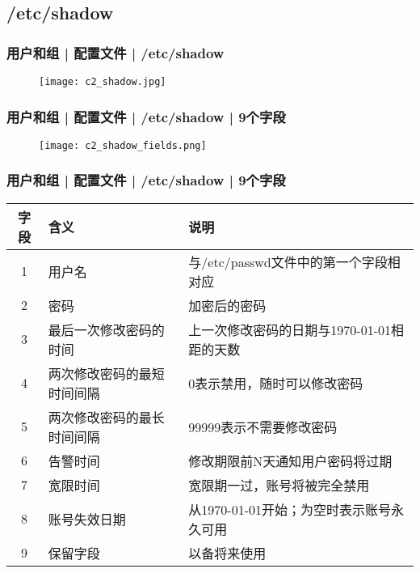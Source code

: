 \subsection{/etc/shadow}
\begin{frame}
  \frametitle{用户和组 | 配置文件 | /etc/shadow}
  \begin{figure}
    \centering
    \texttt{[image: c2\_shadow.jpg]}
  \end{figure}
\end{frame}

\begin{frame}
  \frametitle{用户和组 | 配置文件 | /etc/shadow | 9个字段}
  \begin{figure}
    \centering
    \texttt{[image: c2\_shadow\_fields.png]}
  \end{figure}
\end{frame}

\begin{frame}
  \frametitle{用户和组 | 配置文件 | /etc/shadow | 9个字段}
  \begin{table}
    \centering
    \begin{tabularx}{\textwidth}{clX}
      \hline
      \rowcolor{blue!50}字段 & 含义 & 说明\\
      \hline
      1 & 用户名 & 与/etc/passwd文件中的第一个字段相对应\\
      2 & 密码 & 加密后的密码\\
      3 & 最后一次修改密码的时间 & 上一次修改密码的日期与1970-01-01相距的天数\\
      4 & 两次修改密码的最短时间间隔 & 0表示禁用，随时可以修改密码\\
      5 & 两次修改密码的最长时间间隔 & 99999表示不需要修改密码\\
      6 & 告警时间 & 修改期限前N天通知用户密码将过期\\
      7 & 宽限时间 & 宽限期一过，账号将被完全禁用\\
      8 & 账号失效日期 & 从1970-01-01开始；为空时表示账号永久可用\\
      9 & 保留字段 & 以备将来使用\\
      \hline
    \end{tabularx}
  \end{table}
\end{frame}

